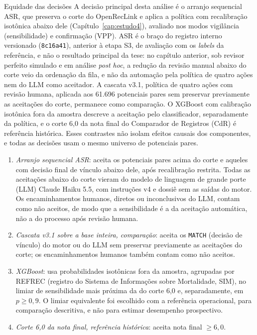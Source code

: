 \begin{chapter}{Equidade das decisões}
A decisão principal desta análise é o arranjo sequencial ASR, que preserva o corte do OpenRecLink e aplica a política com recalibração isotônica abaixo dele (Capítulo~\ref{cap:estudo4}), avaliado nos modos vigilância (sensibilidade) e confirmação (VPP). ASR é o braço do registro interno versionado (\texttt{8c16a41}), anterior à etapa S3, de avaliação com os \textit{labels} da referência, e não o resultado principal da tese: no capítulo anterior, sob revisor perfeito simulado e em análise \textit{post hoc}, a redução da revisão manual abaixo do corte veio da ordenação da fila, e não da automação pela política de quatro ações nem do LLM como aceitador. A cascata v3.1, política de quatro ações com revisão humana, aplicada aos 61.696 potenciais pares sem preservar previamente as aceitações do corte, permanece como comparação. O XGBoost com calibração isotônica fora da amostra descreve a aceitação pelo classificador, separadamente da política, e o corte 6,0 da nota final do Comparador de Registros (CdR) é referência histórica. Esses contrastes não isolam efeitos causais dos componentes, e todas as decisões usam o mesmo universo de potenciais pares.

\begin{enumerate}
\item \textit{Arranjo sequencial ASR}: aceita os potenciais pares acima do corte e aqueles com decisão final de vínculo abaixo dele, após recalibração restrita. Todas as aceitações abaixo do corte vieram do modelo de linguagem de grande porte (LLM) Claude Haiku 5.5, com instruções v4 e dossiê sem as saídas do motor. Os encaminhamentos humanos, diretos ou inconclusivos do LLM, contam como não aceitos, de modo que a sensibilidade é a da aceitação automática, não a do processo após revisão humana.
\item \textit{Cascata v3.1 sobre a base inteira, comparação}: aceita os \texttt{MATCH} (decisão de vínculo) do motor ou do LLM sem preservar previamente as aceitações do corte; os encaminhamentos humanos também contam como não aceitos.
\item \textit{XGBoost}: usa probabilidades isotônicas fora da amostra, agrupadas por REFREC (registro do Sistema de Informações sobre Mortalidade, SIM), no limiar de sensibilidade mais próxima da do corte 6,0 e, separadamente, em $p\geq0{,}9$. O limiar equivalente foi escolhido com a referência operacional, para comparação descritiva, e não para estimar desempenho prospectivo.
\item \textit{Corte 6,0 da nota final, referência histórica}: aceita nota final $\geq6{,}0$.
\end{enumerate}


\end{chapter}
